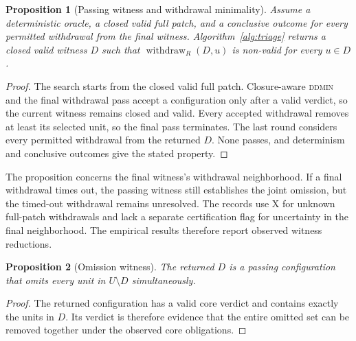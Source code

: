 \documentclass[a4paper,fleqn]{cas-sc}
\newcommand{\lab}[1]{\textsf{#1}}
\newcommand{\withdraw}{\operatorname{withdraw}}
\newtheorem{proposition}{Proposition}
\begin{document}
\begin{proposition}[Passing witness and withdrawal minimality]\label{prop:minimality}
Assume a deterministic oracle, a closed valid full patch, and a conclusive outcome for every permitted withdrawal from the final witness. Algorithm~\ref{alg:triage} returns a closed valid witness $D$ such that $\withdraw_R(D,u)$ is non-valid for every $u\in D$.
\end{proposition}
\begin{proof}
The search starts from the closed valid full patch. Closure-aware \textsc{ddmin} and the final withdrawal pass accept a configuration only after a valid verdict, so the current witness remains closed and valid. Every accepted withdrawal removes at least its selected unit, so the final pass terminates. The last round considers every permitted withdrawal from the returned $D$. None passes, and determinism and conclusive outcomes give the stated property.
\end{proof}

The proposition concerns the final witness's withdrawal neighborhood. If a final withdrawal times out, the passing witness still establishes the joint omission, but the timed-out withdrawal remains unresolved. The records use \lab{X} for unknown full-patch withdrawals and lack a separate certification flag for uncertainty in the final neighborhood. The empirical results therefore report observed witness reductions.

\begin{proposition}[Omission witness]\label{prop:omission}
The returned $D$ is a passing configuration that omits every unit in $U\setminus D$ simultaneously.
\end{proposition}
\begin{proof}
The returned configuration has a valid core verdict and contains exactly the units in $D$. Its verdict is therefore evidence that the entire omitted set can be removed together under the observed core obligations.
\end{proof}
\end{document}
